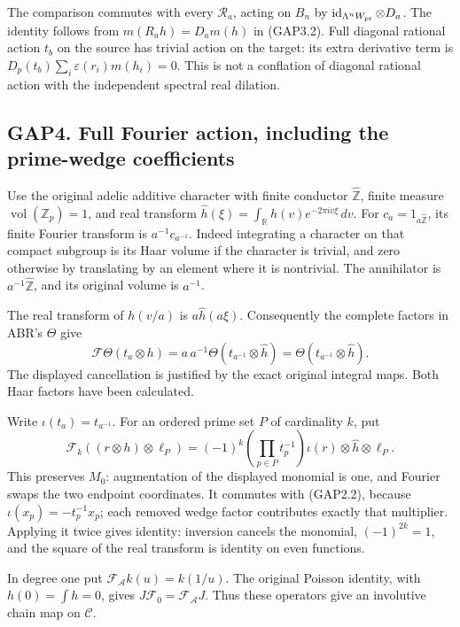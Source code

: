 The comparison commutes with every \(\mathscr R_a\), acting on \(B_n\)
by \(\operatorname{id}_{\Lambda^nW_{\rm pr}}\otimes D_a\). The identity
follows from \(m(R_ah)=D_am(h)\) in (GAP3.2). Full diagonal rational
action \(t_b\) on the source has trivial action on the target: its extra
derivative term is \(D_p(t_b)\sum_i\varepsilon(r_i)m(h_i)=0\). This is
not a conflation of diagonal rational action with the independent
spectral real dilation.

\subsection{GAP4. Full Fourier action, including the prime-wedge
coefficients}\label{gap4.-full-fourier-action-including-the-prime-wedge-coefficients}

Use the original adelic additive character with finite conductor
\(\widehat{\mathbb Z}\), finite measure
\(\operatorname{vol}(\mathbb Z_p)=1\), and real transform
\(\widehat h(\xi)=\int_{\mathbb R}h(v)e^{-2\pi iv\xi}\,dv\). For
\(c_a=1_{a\widehat{\mathbb Z}}\), its finite Fourier transform is
\(a^{-1}c_{a^{-1}}\). Indeed integrating a character on that compact
subgroup is its Haar volume if the character is trivial, and zero
otherwise by translating by an element where it is nontrivial. The
annihilator is \(a^{-1}\widehat{\mathbb Z}\), and its original volume is
\(a^{-1}\).

The real transform of \(h(v/a)\) is \(a\widehat h(a\xi)\). Consequently
the complete factors in ABR's \(\Theta\) give \[
\mathcal F\Theta(t_a\otimes h)=
a\,a^{-1}\Theta(t_{a^{-1}}\otimes\widehat h)
=\Theta(t_{a^{-1}}\otimes\widehat h).
\tag{GAP4.1}
\] The displayed cancellation is justified by the exact original
integral maps. Both Haar factors have been calculated.

Write \(\iota(t_a)=t_{a^{-1}}\). For an ordered prime set \(P\) of
cardinality \(k\), put \[
\mathcal F_k((r\otimes h)\otimes\ell_P)
=(-1)^k\left(\prod_{p\in P}t_p^{-1}\right)\iota(r)
 \otimes\widehat h\otimes\ell_P.
\tag{GAP4.2}
\] This preserves \(M_0\): augmentation of the displayed monomial is
one, and Fourier swaps the two endpoint coordinates. It commutes with
(GAP2.2), because \(\iota(x_p)=-t_p^{-1}x_p\); each removed wedge factor
contributes exactly that multiplier. Applying it twice gives identity:
inversion cancels the monomial, \((-1)^{2k}=1\), and the square of the
real transform is identity on even functions.

In degree one put \(\mathcal F_{\mathcal A}k(u)=k(1/u)\). The original
Poisson identity, with \(h(0)=\int h=0\), gives
\(J\mathcal F_0=\mathcal F_{\mathcal A}J\). Thus these operators give an
involutive chain map on \(\mathscr C\).

